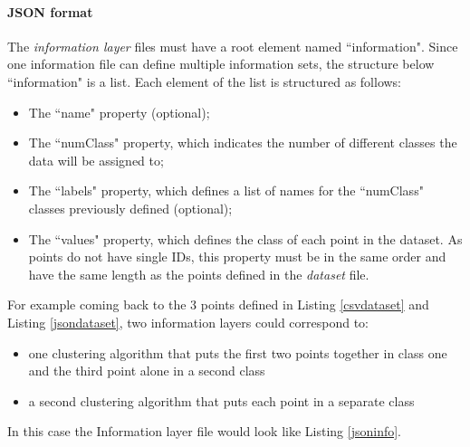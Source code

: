 \documentclass[10pt]{bmc_article}
\newenvironment{bmcformat}{\baselineskip20pt\sloppy\setboolean{publ}{false}}{\baselineskip20pt\sloppy}
\begin{document}
\begin{bmcformat}
\paragraph{JSON format}
The {\it{information layer}} files must have a root element named  ``information". Since one information file can define multiple information sets, the structure below ``information" is a list. Each element of the list is structured as follows:
\begin{itemize}
\item{The ``name" property (optional);}
\item{The ``numClass" property, which indicates the number of different classes the data will be assigned to;}
\item{The ``labels" property, which defines a list of names for the ``numClass" classes previously defined (optional);}
\item{The ``values" property, which defines the class of each point in the dataset. As points do not have single IDs, this property must be in the same order and have the same length as the points defined in the {\it{dataset}} file.}
\end{itemize}

For example coming back to the 3 points defined in Listing \ref{csvdataset} and Listing \ref{jsondataset}, two information layers could correspond to: 
\begin{itemize}

\item{one clustering algorithm that puts the first two points together in class one and the third point alone in a second class}
\item{a second clustering algorithm that puts each point in a separate class}
\end{itemize}

In this case the Information layer file would look like Listing \ref{jsoninfo}.


\end{bmcformat}
\end{document}
